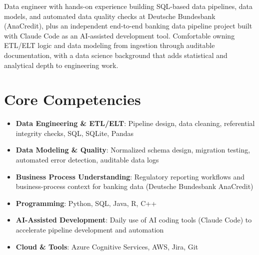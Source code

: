 \documentclass[11pt,a4paper,sans]{moderncv}
\begin{document}
\makecvtitle


\vspace{6pt}
\small{Data engineer with hands-on experience building SQL-based data pipelines, data models, and automated data quality checks at Deutsche Bundesbank (AnaCredit), plus an independent end-to-end banking data pipeline project built with Claude Code as an AI-assisted development tool. Comfortable owning ETL/ELT logic and data modeling from ingestion through auditable documentation, with a data science background that adds statistical and analytical depth to engineering work.}


\section{Core Competencies}
\vspace{1pt}
\begin{itemize}

\item \textbf{Data Engineering \& ETL/ELT}: Pipeline design, data cleaning, referential integrity checks, SQL, SQLite, Pandas

\item \textbf{Data Modeling \& Quality}: Normalized schema design, migration testing, automated error detection, auditable data logs

\item \textbf{Business Process Understanding}: Regulatory reporting workflows and business-process context for banking data (Deutsche Bundesbank AnaCredit)

\item \textbf{Programming}: Python, SQL, Java, R, C++

\item \textbf{AI-Assisted Development}: Daily use of AI coding tools (Claude Code) to accelerate pipeline development and automation

\item \textbf{Cloud \& Tools}: Azure Cognitive Services, AWS, Jira, Git

\end{itemize}
\end{document}
